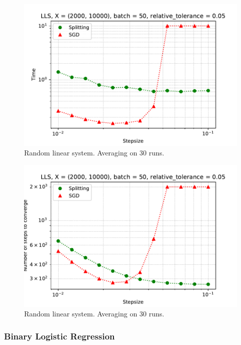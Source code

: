 \documentclass{article}
\begin{document}
\begin{figure}[ht]
\vskip 0.2in
\begin{center}
\centerline{\includegraphics[width=\columnwidth]{sgd_split_iterations_lls.pdf}}
\caption{Random linear system. Averaging on 30 runs.}
\label{strang:fig:lls_step_iter}
\end{center}
\vskip -0.2in
\end{figure}

\begin{figure}[ht]
\vskip 0.2in
\begin{center}
\centerline{\includegraphics[width=\columnwidth]{sgd_split_time_lls.pdf}}
\caption{Random linear system. Averaging on 30 runs.}
\label{strang:fig:lls_step_time}
\end{center}
\vskip -0.2in
\end{figure}

\subsubsection{Binary Logistic Regression}
\end{document}
